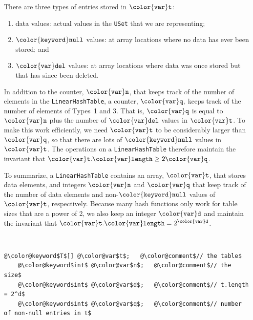 \documentclass[10pt]{book}
\theoremstyle{plain}
\theoremstyle{definition}
\begin{document}
There are three types of entries stored in \ensuremath{\mathtt{{\color{var}t}}}: 
\begin{enumerate}
  \item data values: actual values in the \texttt{USet} that we are representing;
  \item \ensuremath{\mathtt{{\color{keyword}null}}} values: at array locations where no data has ever been
  stored; and
  \item \ensuremath{\mathtt{{\color{var}del}}} values: at array locations where data was once stored but that
   has since been deleted.
\end{enumerate}
In addition to the counter, \ensuremath{\mathtt{{\color{var}n}}}, that keeps track of the number of elements
in the \texttt{LinearHashTable}, a counter, \ensuremath{\mathtt{{\color{var}q}}}, keeps track of the number of
elements of Types~1 and 3.  That is, \ensuremath{\mathtt{{\color{var}q}}} is equal to \ensuremath{\mathtt{{\color{var}n}}} plus the number
of \ensuremath{\mathtt{{\color{var}del}}} values in \ensuremath{\mathtt{{\color{var}t}}}.  To make this work efficiently, we need
\ensuremath{\mathtt{{\color{var}t}}} to be considerably larger than \ensuremath{\mathtt{{\color{var}q}}}, so that there are lots of \ensuremath{\mathtt{{\color{keyword}null}}}
values in \ensuremath{\mathtt{{\color{var}t}}}.  The operations on a \texttt{LinearHashTable} therefore maintain
the invariant that $\ensuremath{\mathtt{{\color{var}t}.{\color{var}length}}}\ge 2\ensuremath{\mathtt{{\color{var}q}}}$.

To summarize, a \texttt{LinearHashTable} contains an array, \ensuremath{\mathtt{{\color{var}t}}}, that stores
data elements, and integers \ensuremath{\mathtt{{\color{var}n}}} and \ensuremath{\mathtt{{\color{var}q}}} that keep track of the number of
data elements and non-\ensuremath{\mathtt{{\color{keyword}null}}} values of \ensuremath{\mathtt{{\color{var}t}}}, respectively.  Because many
hash functions only work for table sizes that are a power of 2, we also
keep an integer \ensuremath{\mathtt{{\color{var}d}}} and maintain the invariant that $\ensuremath{\mathtt{{\color{var}t}.{\color{var}length}}}=2^\ensuremath{\mathtt{{\color{var}d}}}$.


 \ \vspace{.5ex}\begin{Verbatim}[gobble=1,tabsize=2,frame=single,framerule=1.2pt,commandchars=\\@\$,label=\texttt{LinearHashTable},labelposition=topline]
	@\color@keyword$T$[] @\color@var$t$;   @\color@comment$// the table$
	@\color@keyword$int$ @\color@var$n$;   @\color@comment$// the size$
	@\color@keyword$int$ @\color@var$d$;   @\color@comment$// t.length = 2^d$
	@\color@keyword$int$ @\color@var$q$;   @\color@comment$// number of non-null entries in t$
\end{Verbatim}
\end{document}
